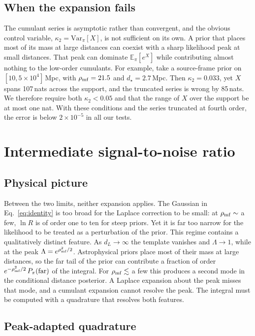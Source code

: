 \documentclass[prd,twocolumn,nofootinbib,superscriptaddress,amsmath,amssymb]{revtex4-2}
\newcommand{\rhomf}{\rho_{\rm mf}}
\newcommand{\ds}{d_\star}
\newcommand{\Lam}{\Lambda}
\newcommand{\E}{\mathbb{E}}
\newcommand{\Var}{\mathrm{Var}}
\begin{document}
\subsection{When the expansion fails}

The cumulant series is asymptotic rather than convergent,
and the obvious control variable,
$\kappa_2=\Var_\pi[X]$,
is not sufficient on its own.
A prior that places most of its mass at large distances can coexist with a sharp likelihood peak at small distances.
That peak can dominate $\E_\pi[e^X]$ while contributing almost nothing to the low-order cumulants.
For example,
take a source-frame prior on $[10,5\times10^4]$\,Mpc,
with $\rhomf = 21.5$ and $\ds = 2.7$\,Mpc.
Then $\kappa_2 = 0.033$,
yet $X$ spans 107\,nats across the support,
and the truncated series is wrong by 85\,nats.
We therefore require both $\kappa_2<0.05$ and that the range of $X$ over the support be at most one nat.
With these conditions and the series truncated at fourth order,
the error is below $2\times10^{-5}$ in all our tests.

\section{Intermediate signal-to-noise ratio}
\label{sec:medium}

\subsection{Physical picture}

Between the two limits,
neither expansion applies.
The Gaussian in Eq.~\eqref{eq:identity} is too broad for the Laplace correction to be small: at $\rhomf\sim$ a few,
$\ln R$ is of order one to ten for steep priors.
Yet it is far too narrow for the likelihood to be treated as a perturbation of the prior.
This regime contains a qualitatively distinct feature.
As $d_L\to\infty$ the template vanishes and $\Lam\to1$,
while at the peak $\Lam = e^{\rhomf^2/2}$.
Astrophysical priors place most of their mass at large distances,
so the far tail of the prior can contribute a fraction of order $e^{-\rhomf^2/2}\,P_\pi(\text{far})$ of the integral.
For $\rhomf\lesssim$ a few this produces a second mode in the conditional distance posterior.
A Laplace expansion about the peak misses that mode,
and a cumulant expansion cannot resolve the peak.
The integral must be computed with a quadrature that resolves both features.

\subsection{Peak-adapted quadrature}
\end{document}
